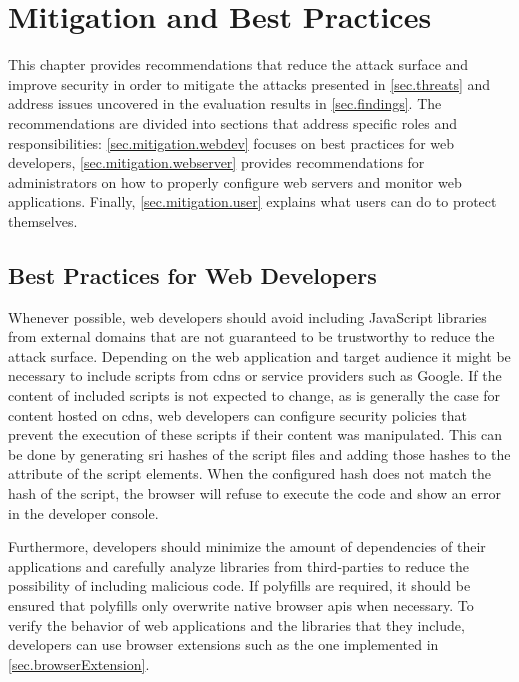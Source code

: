 \chapter{Mitigation and Best Practices}
\label{sec.mitigation}

This chapter provides recommendations that reduce the attack surface and improve security in order to mitigate the attacks presented in \autoref{sec.threats} and address issues uncovered in the evaluation results in \autoref{sec.findings}. The recommendations are divided into sections that address specific roles and responsibilities: \autoref{sec.mitigation.webdev} focuses on best practices for web developers, \autoref{sec.mitigation.webserver} provides recommendations for administrators on how to properly configure web servers and monitor web applications. Finally, \autoref{sec.mitigation.user} explains what users can do to protect themselves.

\section{Best Practices for Web Developers}
\label{sec.mitigation.webdev}

Whenever possible, web developers should avoid including JavaScript libraries from external domains that are not guaranteed to be trustworthy to reduce the attack surface. Depending on the web application and target audience it might be necessary to include scripts from \acp{cdn} or service providers such as Google. If the content of included scripts is not expected to change, as is generally the case for content hosted on \acp{cdn}, web developers can configure security policies that prevent the execution of these scripts if their content was manipulated. This can be done by generating \ac{sri} hashes of the script files and adding those hashes to the  attribute of the script elements. When the configured hash does not match the hash of the script, the browser will refuse to execute the code and show an error in the developer console. \cite{MozSRI}

Furthermore, developers should minimize the amount of dependencies of their applications and carefully analyze libraries from third-parties to reduce the possibility of including malicious code. If polyfills are required, it should be ensured that polyfills only overwrite native browser \acp{api} when necessary. To verify the behavior of web applications and the libraries that they include, developers can use browser extensions such as the one implemented in \autoref{sec.browserExtension}.

